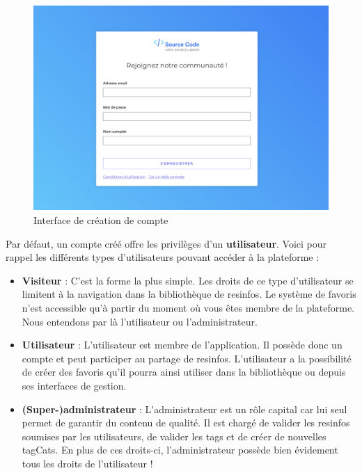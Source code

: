 \begin{figure}[H]
    \includegraphics[width=\textwidth,height=0.35\textheight,keepaspectratio]{images/client/register.png}
    \centering
    \caption[SourceCode : interface de création de compte]{Interface de création de compte}
\end{figure}

Par défaut, un compte créé offre les privilèges d'un \textbf{utilisateur}. Voici pour rappel les différents types d'utilisateurs pouvant accéder à la plateforme :

\begin{itemize}
    \item \textbf{Visiteur} : C'est la forme la plus simple. Les droits de ce type d'utilisateur se limitent à la navigation dans la bibliothèque de \glspl{resinfo}. Le système de favoris n'est accessible qu'à partir du moment où vous êtes membre de la plateforme. Nous entendons par là l'utilisateur ou l'administrateur.
    \item \textbf{Utilisateur} : L'utilisateur est membre de l'application. Il possède donc un compte et peut participer au partage de \glspl{resinfo}. L'utilisateur a la possibilité de créer des favoris qu'il pourra ainsi utiliser dans la bibliothèque ou depuis ses interfaces de gestion.
    \item \textbf{(Super-)administrateur} : L'administrateur est un rôle capital car lui seul permet de garantir du contenu de qualité. Il est chargé de valider les \glspl{resinfo} soumises par les utilisateurs, de valider les \glspl{tag} et de créer de nouvelles \glspl{tagCat}. En plus de ces droits-ci, l'administrateur possède bien évidement tous les droits de l'utilisateur !
\end{itemize}

